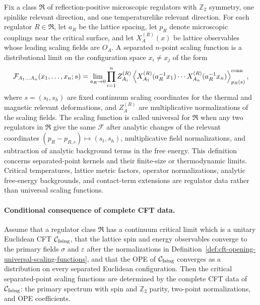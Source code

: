 \begin{definition}
\label{def:cft-opening-universal-scaling-functions}
Fix a class \(\mathfrak R\) of reflection-positive microscopic regulators with
\(\mathbb Z_2\) symmetry, one spinlike relevant direction, and one
temperaturelike relevant direction.  For each regulator \(R\in\mathfrak R\),
let \(a_R\) be the lattice spacing, let \(p_R\) denote microscopic couplings
near the critical surface, and let \(X_A^{(R)}(x)\) be lattice observables
whose leading scaling fields are \(O_A\).  A separated \(n\)-point scaling
function is a distributional limit on the configuration space \(x_i\neq x_j\)
of the form
\[
  \mathcal F_{A_1\ldots A_n}(x_1,\ldots,x_n;s)
  =
  \lim_{a_R\to0}
  \prod_{i=1}^n Z_{A_i}^{(R)}
  \left\langle
    X_{A_1}^{(R)}(a_R^{-1}x_1)\cdots
    X_{A_n}^{(R)}(a_R^{-1}x_n)
  \right\rangle^{\rm conn}_{p_R(s)} ,
\]
where \(s=(s_t,s_h)\) are fixed continuum scaling coordinates for the thermal
and magnetic relevant deformations, and \(Z_A^{(R)}\) are multiplicative
normalizations of the scaling fields.  The scaling function is called
universal for \(\mathfrak R\) when any two regulators in \(\mathfrak R\) give
the same \(\mathcal F\) after analytic changes of the relevant coordinates
\((p_R-p_{R,c})\mapsto(s_t,s_h)\), multiplicative field normalizations, and
subtraction of analytic background terms in the free energy.  This definition
concerns separated-point kernels and their finite-size or thermodynamic
limits.  Critical temperatures, lattice metric factors, operator
normalizations, analytic free-energy backgrounds, and contact-term extensions
are regulator data rather than universal scaling functions.
\end{definition}

\paragraph{Conditional consequence of complete CFT data.}
Assume that a regulator class \(\mathfrak R\) has a continuum critical limit
which is a unitary Euclidean CFT \(\mathcal C_{\rm Ising}\), that the lattice
spin and energy observables converge to the primary fields \(\sigma\) and
\(\varepsilon\) after the normalizations in
Definition~\ref{def:cft-opening-universal-scaling-functions}, and that the
OPE of \(\mathcal C_{\rm Ising}\) converges as a distribution on every
separated Euclidean configuration.  Then the critical separated-point scaling
functions are determined by the complete CFT data of \(\mathcal C_{\rm Ising}\):
the primary spectrum with spin and \(\mathbb Z_2\) parity, two-point
normalizations, and OPE coefficients.

